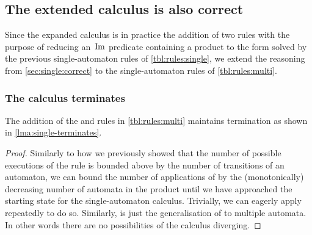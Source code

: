 \documentclass[acmsmall,review,anonymous,screen]{acmart}\settopmatter{printfolios=true,printccs=false,printacmref=true}
\theoremstyle{definition}
\begin{document}
\subsection{The extended calculus is also correct}

Since the expanded calculus is in practice the addition of two rules with the
purpose of reducing an~$\operatorname{Im}$ predicate containing a product to the form
solved by the previous single-automaton rules of \cref{tbl:rules:single}, we
extend the reasoning from \cref{sec:single:correct} to the single-automaton
rules of \cref{tbl:rules:multi}.

\subsubsection{The calculus terminates}
\begin{lemma}
  The addition of the \ExpandM{} and \Materialise{} rules in \cref{tbl:rules:multi}
  maintains termination as shown in \cref{lma:single-terminates}.
\end{lemma}
\begin{proof}
  Similarly to how we previously showed that the number of possible executions
  of the \Split{} rule is bounded above by the number of transitions of an
  automaton, we can bound the number of applications of \Materialise{} by the
  (monotonically) decreasing number of automata in the product until we have
  approached the starting state for the single-automaton calculus. Trivially, we
  can eagerly apply \Materialise{} repeatedly to do so. Similarly, \ExpandM{} is
  just the generalisation of \Expand{} to multiple automata. In other words there are no possibilities of the calculus diverging.
\end{proof}
\end{document}

